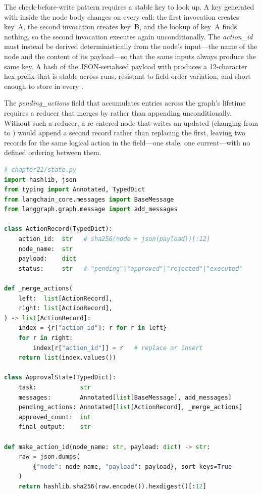 The check-before-write pattern requires a stable key to look up. A key
generated with  inside the node body changes on every call:
the first invocation creates key~A, the second invocation creates
key~B, and the lookup of key~A finds nothing, so the second invocation
executes again unconditionally. The \emph{action\_id} must instead be
derived deterministically from the node's input---the name of the node
and the content of its payload---so that the same inputs always produce
the same key. A  hash of the JSON-serialised payload with
 produces a 12-character hex prefix that is stable
across runs, resistant to field-order variation, and short enough to store
in every .

The \emph{pending\_actions} field that accumulates 
entries across the graph's lifetime requires a reducer that merges by
 rather than appending unconditionally. Without such a
reducer, a re-entered node that writes an updated 
(changing  from  to ) would
append a second record rather than replacing the first, leaving two
records for the same logical action in the field---one stale, one
current---with no defined ordering between them.

\begin{lstlisting}[language=Python,
  caption={State schema, by-ID reducer, and deterministic action
           identifier},
  label={lst:hitl-state}]
# chapter21/state.py
import hashlib, json
from typing import Annotated, TypedDict
from langchain_core.messages import BaseMessage
from langgraph.graph.message import add_messages

class ActionRecord(TypedDict):
    action_id:  str   # sha256(node + json(payload))[:12]
    node_name:  str
    payload:    dict
    status:     str   # "pending"|"approved"|"rejected"|"executed"

def _merge_actions(
    left:  list[ActionRecord],
    right: list[ActionRecord],
) -> list[ActionRecord]:
    index = {r["action_id"]: r for r in left}
    for r in right:
        index[r["action_id"]] = r   # replace or insert
    return list(index.values())

class ApprovalState(TypedDict):
    task:            str
    messages:        Annotated[list[BaseMessage], add_messages]
    pending_actions: Annotated[list[ActionRecord], _merge_actions]
    approved_count:  int
    final_output:    str

def make_action_id(node_name: str, payload: dict) -> str:
    raw = json.dumps(
        {"node": node_name, "payload": payload}, sort_keys=True
    )
    return hashlib.sha256(raw.encode()).hexdigest()[:12]
\end{lstlisting}

